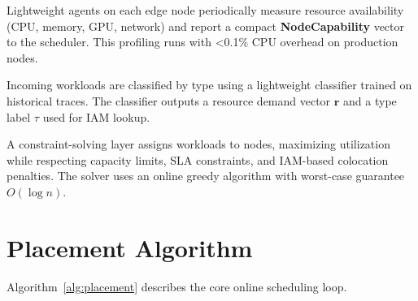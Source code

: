 \documentclass[12pt,letterpaper,twoside]{report}
\begin{document}
\begin{tcolorbox}[colback=accentSlate!8,colframe=accentSlate!50,title=\textbf{Stage 1: Profiling},coltitle=white,colbacktitle=accentSlate]
Lightweight agents on each edge node periodically measure resource availability (CPU, memory, GPU, network) and report a compact \textbf{NodeCapability} vector to the scheduler. This profiling runs with \textless 0.1\% CPU overhead on production nodes.
\end{tcolorbox}

\vspace{8pt}
\begin{tcolorbox}[colback=accentSlate!8,colframe=accentSlate!50,title=\textbf{Stage 2: Workload Classification},coltitle=white,colbacktitle=accentSlate]
Incoming workloads are classified by type using a lightweight classifier trained on historical traces. The classifier outputs a resource demand vector \(\mathbf{r}\) and a type label \(\tau\) used for IAM lookup.
\end{tcolorbox}

\vspace{8pt}
\begin{tcolorbox}[colback=accentSlate!8,colframe=accentSlate!50,title=\textbf{Stage 3: Placement Optimization},coltitle=white,colbacktitle=accentSlate]
A constraint-solving layer assigns workloads to nodes, maximizing utilization while respecting capacity limits, SLA constraints, and IAM-based colocation penalties. The solver uses an online greedy algorithm with worst-case guarantee \(O(\log n)\).
\end{tcolorbox}

\section{Placement Algorithm}

\vspace{6pt}
Algorithm~\ref{alg:placement} describes the core online scheduling loop.
\end{document}
